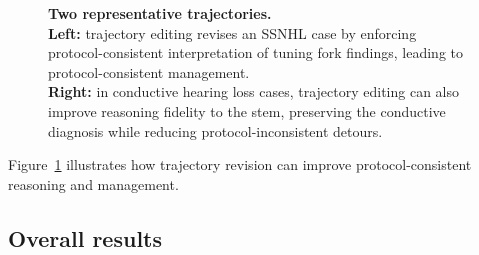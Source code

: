 \documentclass[twocolumn]{article}
\begin{document}
\begin{figure}[!htbp]

  \caption{ \textbf{Two representative trajectories.}\\
    \textbf{Left:} trajectory editing revises an SSNHL case by enforcing
    protocol-consistent interpretation of tuning fork findings, leading to
    protocol-consistent management.\\
    \textbf{Right:} in conductive hearing loss cases, trajectory editing can
    also improve reasoning fidelity to the stem, preserving the conductive
    diagnosis while reducing protocol-inconsistent detours.
    }\label{fig:ssnhl_examples}
\end{figure}

Figure~\ref{fig:ssnhl_examples} illustrates how trajectory revision can improve
protocol-consistent reasoning and management.

\subsection{Overall results}\label{sec:ssnhl_results}
\end{document}
